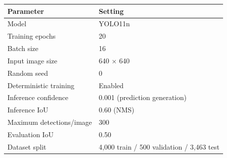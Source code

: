 \begin{tabular}{ll}
\toprule
Parameter & Setting \\
\midrule
Model & YOLO11n \\
Training epochs & 20 \\
Batch size & 16 \\
Input image size & 640 × 640 \\
Random seed & 0 \\
Deterministic training & Enabled \\
Inference confidence & 0.001 (prediction generation) \\
Inference IoU & 0.60 (NMS) \\
Maximum detections/image & 300 \\
Evaluation IoU & 0.50 \\
Dataset split & 4,000 train / 500 validation / 3,463 test \\
\bottomrule
\end{tabular}
